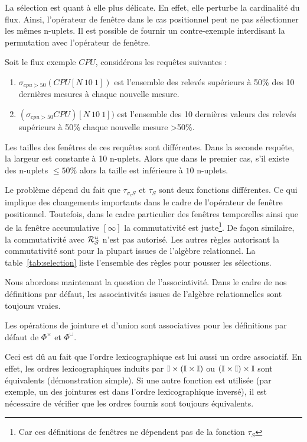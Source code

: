 La sélection est quant à elle plus délicate. En effet, elle perturbe la cardinalité du flux. Ainsi, l'opérateur de fenêtre dans le cas positionnel peut ne pas sélectionner les mêmes n-uplets. Il est possible de fournir un contre-exemple interdisant la permutation avec l'opérateur de fenêtre.
\begin{example}
Soit le flux exemple $CPU$, considérons les requêtes suivantes :
\begin{enumerate}
	\item $\sigma_{cpu>50} (CPU[N\ 10\ 1])$ est l'ensemble des relevés supérieurs à 50\% des 10 dernières mesures à chaque nouvelle mesure.
	\item $(\sigma_{cpu>50} CPU)[N\ 10\ 1])$ est l'ensemble des 10 dernières valeurs des relevés supérieurs à 50\% chaque nouvelle mesure >50\%.
\end{enumerate}
Les tailles des fenêtres de ces requêtes sont différentes. Dans la seconde requête, la largeur est constante à 10 n-uplets. Alors que dans le premier cas, s'il existe des n-uplets $\leq 50\%$ alors la taille est inférieure à $10$ n-uplets.
\end{example}
Le problème dépend du fait que $\tau_{\sigma_c S}$ et $\tau_S$ sont deux fonctions différentes. Ce qui implique des changements importants dans le cadre de l'opérateur de fenêtre positionnel. Toutefois, dans le cadre particulier des fenêtres temporelles ainsi que de la fenêtre accumulative $[\infty]$ la commutativité est juste\footnote{Car ces définitions de fenêtres ne dépendent pas de la fonction $\tau_S$}. De façon similaire, la commutativité avec $\mathcal{R}_{\mathcal S}^{u}$ n'est pas autorisé. Les autres règles autorisant la commutativité sont pour la plupart issues de l'algèbre relationnel. La table~\ref{tab:selection} liste l'ensemble des règles pour pousser les sélections.

Nous abordons maintenant la question de l'associativité. Dans le cadre de nos définitions par défaut, les associativités issues de l'algèbre relationnelles sont toujours vraies.
\begin{prop}
Les opérations de jointure et d'union sont associatives pour les définitions par défaut de $\Phi^\times$ et $\Phi^\cup$.
\end{prop}
Ceci est dû au fait que l'ordre lexicographique est lui aussi un ordre associatif. En effet, les ordres lexicographiques induits par $\mathbb{I}\times(\mathbb{I}\times\mathbb{I})$ ou $(\mathbb{I}\times\mathbb{I})\times \mathbb{I}$ sont équivalents (démonstration simple). Si une autre fonction est utilisée (par exemple, un des jointures est dans l'ordre lexicographique inversé), il est nécessaire de vérifier que les ordres fournis sont toujours équivalents.

